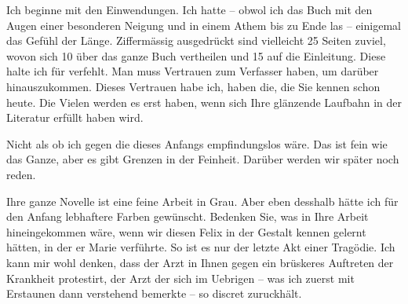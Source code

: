 \pstart
           Ich beginne mit den Einwendungen. Ich hatte – obwol ich das Buch mit den Augen einer besonderen Neigung
               und in einem Athem bis zu Ende las – einigemal das Gefühl der Länge. Ziffermässig
               ausgedrückt sind vielleicht 25 Seiten zuviel, wovon sich 10 über das ganze Buch vertheilen und 15 auf die
               Einleitung. Diese halte ich für verfehlt. Man muss {\pb}Vertrauen zum Verfasser haben, um
               darüber hinauszukommen. Dieses Vertrauen habe ich, haben die, die Sie kennen schon
               heute. Die Vielen werden es erst haben, wenn sich Ihre glänzende Laufbahn in der
               Literatur erfüllt haben wird.\pend
           
\pstart
           Nicht als ob ich gegen die \label{K_L03837-2v}\label{K_L03837-2} dieses Anfangs empfindungslos wäre. Das ist fein wie das Ganze,
               aber es gibt Grenzen in der Feinheit. Darüber werden wir später noch reden.\pend
           
\pstart
           Ihre ganze Novelle ist eine
               feine Arbeit in Grau. Aber eben desshalb hätte ich für den Anfang lebhaftere Farben
               gewünscht. Bedenken Sie, was in Ihre Arbeit hineingekommen wäre, wenn wir diesen Felix in der
               Gestalt kennen {\pb}gelernt hätten, in der
               er Marie verführte. So ist es nur der letzte Akt einer Tragödie. Ich kann mir wohl
               denken, dass der Arzt in Ihnen gegen  ein
               brüskeres Auftreten der Krankheit protestirt, der Arzt der sich im Uebrigen – was ich
               zuerst mit Erstaunen dann verstehend bemerkte – so discret zuruckhält.\pend
           
